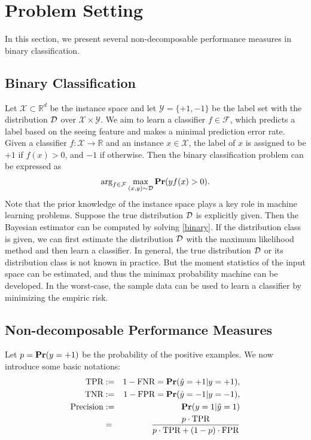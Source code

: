 \documentclass[15pt]{article}
\newcommand{\dataset}{{\cal D}}
\newcommand{\X}{{\mathcal X}}
\newcommand{\Y}{{\mathcal Y}}
\newcommand{\R}{{\mathbb R}}
\newcommand{\be}{\begin{eqnarray}}
\newcommand{\ben}{\begin{eqnarray*}}
\newcommand{\en}{\end{eqnarray}}
\newcommand{\enn}{\end{eqnarray*}}
\begin{document}
\section{Problem Setting}\label{sec2}


In this section, we present several non-decomposable performance measures in binary classification.


\subsection{Binary Classification}


Let $\X\subset\R^d$ be the instance space and let $\Y=\{+1,-1\}$ be the label set with the distribution $\dataset$
over $\X\times\Y$. We aim to learn a classifier $f\in\mathcal{F}$, which predicts a label based on the seeing
feature and makes a minimal prediction error rate.
Given a classifier $f:\X\to\R$ and an instance $x\in\X$, the label of $x$ is assigned to be $+1$ if $f(x)>0$,
and $-1$ if otherwise. Then the binary classification problem can be expressed as
\be\label{binary}
\arg_{f\in\mathcal F}\max_{(x,y)\sim\dataset}{\bf Pr}(yf(x)>0).
\en
Note that the prior knowledge of the instance space plays a key role in machine learning problems.
Suppose the true distribution $\dataset$ is explicitly given. Then the Bayesian estimator can be computed
by solving \eqref{binary}. If the distribution class is given, we can first estimate the distribution $\dataset$
with the maximum likelihood method and then learn a classifier.
In general, the true distribution $\dataset$ or its distribution class is not known in practice.
But the moment statistics of the input space can be estimated, and thus the minimax probability
machine can be developed. In the worst-case, the sample data can be used to learn a classifier
by minimizing the empiric risk.


\subsection{Non-decomposable Performance Measures}


Let $p={\bf Pr}(y =+1)$ be the probability of the positive examples.
We now introduce some basic notations:
\ben
\mbox{TPR}&:=& 1-\mbox{FNR}= {\bf Pr}(\hat y =+1| y =+1),\\
\mbox{TNR}&:=& 1-\mbox{FPR}= {\bf Pr}(\hat y =-1| y =-1),\\
\mbox{Precision}&:=& {\bf Pr}(y =1|\hat y =1)\\
  &=&\frac{p\cdot\mbox{TPR}}{p\cdot\mbox{TPR} +(1-p)\cdot\mbox{FPR}}
\enn
\end{document}
